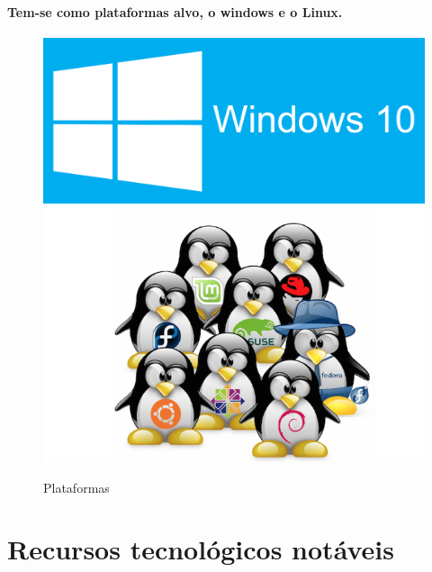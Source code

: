 \documentclass[11pt]{article} %
\begin{document}
\paragraph{Tem-se como plataformas alvo, o windows e o Linux.}
\begin{figure}[!htp]
\begin{center}
  \includegraphics[scale=0.1]{res/windows.png} \quad
  \includegraphics[scale=0.3]{res/linux.png} \quad
\caption{Plataformas} \label{gdimotes}
\end{center}
\end{figure}
 
\section*{Recursos tecnológicos notáveis}
\end{document}
